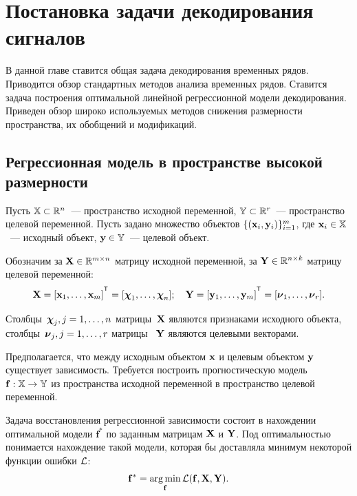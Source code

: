 \chapter{Постановка задачи декодирования сигналов}
\label{ch:intro}

В данной главе ставится общая задача декодирования временных рядов.
Приводится обзор стандартных методов анализа временных рядов.
Ставится задача построения оптимальной линейной регрессионной модели декодирования.
Приведен обзор широко используемых методов снижения размерности пространства, их обобщений и модификаций.

\section{Регрессионная модель в пространстве высокой размерности}
\label{sec:ch1:reg_model}

Пусть $\mathbb{X} \subset \mathbb{R}^n$~--- пространство исходной переменной, $\mathbb{Y} \subset \mathbb{R}^r$~--- пространство целевой переменной.
Пусть задано множество объектов $\{(\mathbf{x}_i, \mathbf{y}_i)\}_{i=1}^m$, где $\mathbf{x}_i \in \mathbb{X}$~--- исходный объект, $\mathbf{y} \in \mathbb{Y}$~--- целевой объект.

Обозначим за $\mathbf{X} \in \mathbb{R}^{m \times n}$ матрицу исходной переменной, за $\mathbf{Y} \in \mathbb{R}^{n \times k}$ матрицу целевой переменной:
\begin{equation*}
	\bX = [\bx_1, \dots, \bx_m]^{\T} =  [\bchi_1, \dots, \bchi_n]; \quad \bY = [\by_1, \dots, \by_m]^{\T} =  [\bnu_1, \dots, \bnu_r].
\end{equation*}

Столбцы~$\boldsymbol{\chi}_j, j=1, \dots, n$ матрицы~$\mathbf{X}$ являются признаками исходного объекта, столбцы~$\boldsymbol{\nu}_j, j=1, \dots, r$ матрицы ~$\mathbf{Y}$ являются целевыми векторами.

Предполагается, что между исходным объектом $\mathbf{x}$ и целевым объектом $\mathbf{y}$ существует зависимость. Требуется построить прогностическую модель $\mathbf{f}: \mathbb{X} \rightarrow \mathbb{Y}$ из пространства исходной переменной в пространство целевой переменной.

Задача восстановления регрессионной зависимости состоит в нахождении оптимальной модели $\mathbf{f}^*$ по заданным матрицам $\mathbf{X}$ и $\mathbf{Y}$. Под оптимальностью понимается нахождение такой модели, которая бы доставляла минимум некоторой функции ошибки $\mathcal{L}$:
\begin{equation}
	\mathbf{f}^* = \mathop{\arg \min}\limits_\mathbf{f} \mathcal{L}(\mathbf{f}, \mathbf{X}, \mathbf{Y}).
	\label{ch1:eq:loss_min}
\end{equation}

